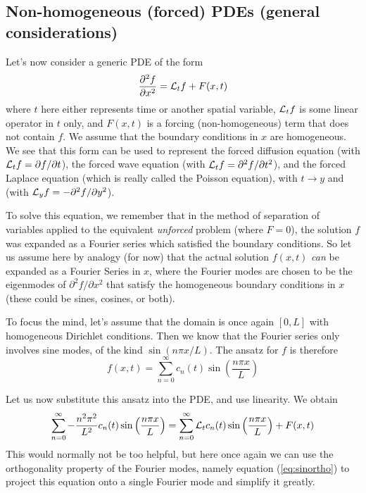 \subsection{Non-homogeneous (forced) PDEs (general considerations)}

Let's now consider a generic PDE of the form
\begin{equation}
    \frac{\partial^2 f}{\partial x^2} = {\cal L}_t f + F(x,t)
\end{equation}
where $t$ here either represents time or another spatial variable,  ${\cal L}_t f $ is some linear operator in $t$ only, and $F(x,t)$ is a forcing (non-homogeneous) term that does not contain $f$. We assume that the boundary conditions in $x$ are homogeneous. 
We see that this form can be used to represent the forced diffusion equation (with ${\cal L}_t f = \partial f/\partial t$), the forced wave equation (with ${\cal L}_t f = \partial^2 f/\partial t^2$), and the forced Laplace equation (which is really called the Poisson equation), with $t \rightarrow y$ and (with ${\cal L}_y f = - \partial^2 f/\partial y^2$). 

To solve this equation, we  remember that in the method of separation of variables applied to the equivalent {\it unforced} problem (where $F = 0$), the solution $f$ was expanded as a  Fourier series which satisfied the boundary conditions. 
So let us assume here by analogy (for now) that the actual solution $f(x,t)$ {\it can} be expanded as a Fourier Series in $x$, where the Fourier modes are chosen to be the eigenmodes of $\partial^2 f / \partial x^2$ that satisfy the homogeneous boundary conditions in $x$ (these could be sines, cosines, or both). 

To focus the mind, let's assume that the domain is once again $[0,L]$ with homogeneous Dirichlet conditions. Then we know that the Fourier series only involves sine modes, of the kind $\sin ( n \pi x / L)$. The ansatz for $f$ is therefore
\begin{equation}
    f(x,t) = \sum_{n = 0}^{\infty} c_n(t) \sin \left( \frac{n\pi x}{L} \right) 
\end{equation}
 
Let us now substitute this ansatz into the PDE, and use linearity. We obtain
\begin{equation}
\sum_{n = 0}^{\infty} - \frac{n^2 \pi^2 }{L^2} c_n(t) \sin \left( \frac{n\pi x}{L} \right) =  \sum_{n = 0}^{\infty} {\cal L}_t c_n(t) \sin \left( \frac{n\pi x}{L} \right) + F(x,t)
\label{eq:substituted}
\end{equation}
This would normally not be too helpful, but here once again we can use the orthogonality property of the Fourier modes, namely equation (\ref{eq:sinortho}) to project this equation onto a single Fourier mode and simplify it greatly.

